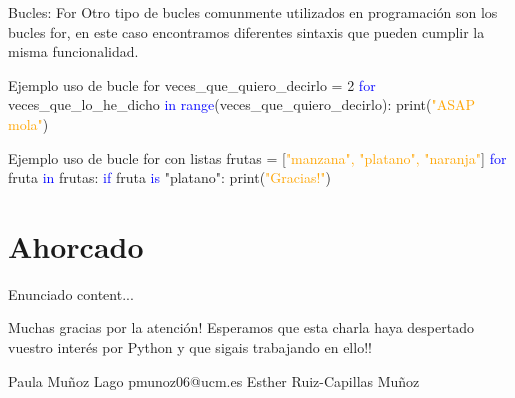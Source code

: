 \documentclass{beamer}
\begin{document}
\begin{frame}{Bucles: For}
Otro tipo de bucles comunmente utilizados en programación son los bucles for, en este caso encontramos diferentes sintaxis que pueden cumplir la misma funcionalidad.
\begin{Programexample}{Ejemplo uso de bucle for}
	veces\_que\_quiero\_decirlo = 2 \newline
	\textcolor{blue}{for} veces\_que\_lo\_he\_dicho \textcolor{blue}{in range}(veces\_que\_quiero\_decirlo): \newline
	\hspace{2cm} print(\textcolor{orange}{"ASAP mola"})
\end{Programexample}
\begin{Programexample}{Ejemplo uso de bucle for con listas}
	frutas = [\textcolor{orange}{"manzana", "platano", "naranja"}] \newline
	\textcolor{blue}{for} fruta \textcolor{blue}{in} frutas: \newline
	\textcolor{blue}{if} fruta \textcolor{blue}{is} "platano": \newline
	\hspace{2cm} print(\textcolor{orange}{"Gracias!"})
\end{Programexample}
\end{frame}
\section{Ahorcado}
\begin{frame}{Enunciado}
content...
\end{frame}

    \begin{frame}[focus]
        Muchas gracias por la atención! \newline
        Esperamos que esta charla haya despertado vuestro interés por Python y que sigais trabajando en ello!!
    \end{frame}

	\begin{frame}[focus]
	Paula Muñoz Lago pmunoz06@ucm.es \newline
	Esther Ruiz-Capillas Muñoz 
	\end{frame}
\end{document}
